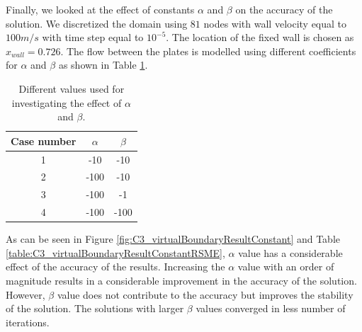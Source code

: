 Finally, we looked at the effect of constants $\alpha$ and $\beta$ on the accuracy of the solution. We discretized the domain using $81$ nodes with wall velocity equal to $100 m/s$ with time step equal to $10^{-5}$. The location of the fixed wall is chosen as $x_{wall} = 0.726$. The flow between the plates is modelled using different coefficients for $\alpha$ and $\beta$ as shown in Table \ref{table:C3_alphaBetaValues}.

\begin{table}[H]
\centering
\begin{tabular}{c | c | c}
     Case number & $\alpha$ & $\beta$ \\ \hline \hline
     1 & -10 & -10 \\ \hline
     2 & -100 & -10 \\ \hline
     3 & -100 & -1 \\ \hline
     4 & -100 & -100 \\
\end{tabular}
\caption{Different values used for investigating the effect of $\alpha$ and $\beta$.}
\label{table:C3_alphaBetaValues}
\end{table}

As can be seen in Figure \ref{fig:C3_virtualBoundaryResultConstant} and Table \ref{table:C3_virtualBoundaryResultConstantRSME}, $\alpha$ value has a considerable effect of the accuracy of the results. Increasing the $\alpha$ value with an order of magnitude results in a considerable improvement in the accuracy of the solution. However, $\beta$ value does not contribute to the accuracy but improves the stability of the solution. The solutions with larger $\beta$ values converged in less number of iterations.

